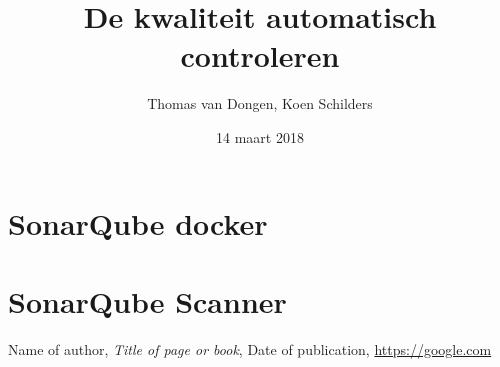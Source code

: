 \documentclass[12pt]{article}
\title{De kwaliteit automatisch controleren}
\author{Thomas van Dongen, Koen Schilders}
\date{14 maart 2018}
\begin{document}
\begin{titlepage}
\maketitle
\end{titlepage}


\section{SonarQube docker}









\section{SonarQube Scanner}




\begin{thebibliography}{9}
	Name of author,
	\textit{Title of page or book},
	Date of publication,
	\url{https://google.com}
\end{thebibliography}
\end{document}
